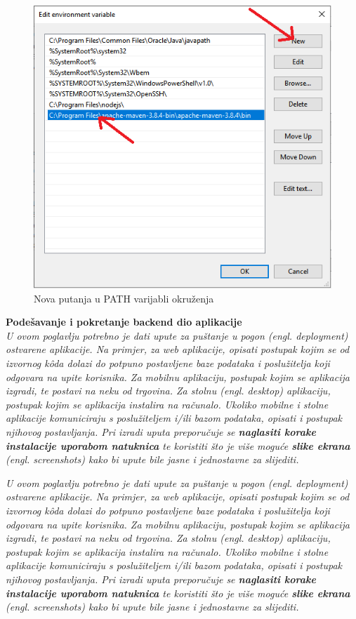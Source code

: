 			\begin{figure}[H]
			\centering
			\includegraphics[width=\textwidth, scale=0.5]{slike/newPathInsert}
			\caption{Nova putanja u PATH varijabli okruženja}
			\label{fig:newPathInsert}
			\end{figure}
			
			\textbf{Podešavanje i pokretanje backend dio aplikacije}\\
			
			
			\textit{U ovom poglavlju potrebno je dati upute za puštanje u pogon (engl. deployment) ostvarene aplikacije. Na primjer, za web aplikacije, opisati postupak kojim se od izvornog kôda dolazi do potpuno postavljene baze podataka i poslužitelja koji odgovara na upite korisnika. Za mobilnu aplikaciju, postupak kojim se aplikacija izgradi, te postavi na neku od trgovina. Za stolnu (engl. desktop) aplikaciju, postupak kojim se aplikacija instalira na računalo. Ukoliko mobilne i stolne aplikacije komuniciraju s poslužiteljem i/ili bazom podataka, opisati i postupak njihovog postavljanja. Pri izradi uputa preporučuje se \textbf{naglasiti korake instalacije uporabom natuknica} te koristiti što je više moguće \textbf{slike ekrana} (engl. screenshots) kako bi upute bile jasne i jednostavne za slijediti.}
		
			 \textit{U ovom poglavlju potrebno je dati upute za puštanje u pogon (engl. deployment) ostvarene aplikacije. Na primjer, za web aplikacije, opisati postupak kojim se od izvornog kôda dolazi do potpuno postavljene baze podataka i poslužitelja koji odgovara na upite korisnika. Za mobilnu aplikaciju, postupak kojim se aplikacija izgradi, te postavi na neku od trgovina. Za stolnu (engl. desktop) aplikaciju, postupak kojim se aplikacija instalira na računalo. Ukoliko mobilne i stolne aplikacije komuniciraju s poslužiteljem i/ili bazom podataka, opisati i postupak njihovog postavljanja. Pri izradi uputa preporučuje se \textbf{naglasiti korake instalacije uporabom natuknica} te koristiti što je više moguće \textbf{slike ekrana} (engl. screenshots) kako bi upute bile jasne i jednostavne za slijediti.}
			
